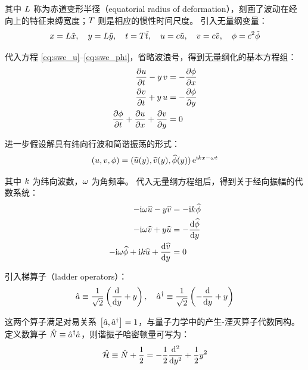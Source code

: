 其中 $L$ 称为赤道变形半径（equatorial radius of deformation），刻画了波动在经向上的特征束缚宽度；$T$ 则是相应的惯性时间尺度。
引入无量纲变量：
\begin{equation}
    x = L\tilde{x}, \quad y = L\tilde{y}, \quad t = T\tilde{t}, \quad u = c\tilde{u}, \quad v = c\tilde{v}, \quad \phi = c^2\tilde{\phi}
\end{equation}

代入方程 \eqref{eq:swe_u}--\eqref{eq:swe_phi}，省略波浪号，得到无量纲化的基本方程组：
\begin{align}
    \pde{u}{\timevar} - y\, v &= -\pde{\gravpotential}{x} \label{eq:nondim_u}\\
    \pde{v}{\timevar} + y\, u &= -\pde{\gravpotential}{y} \label{eq:nondim_v}\\
    \pde{\gravpotential}{\timevar} + \pde{u}{x} + \pde{v}{y} &= 0 \label{eq:nondim_phi}
\end{align}

进一步假设解具有纬向行波和简谐振荡的形式：
\begin{equation}
    (u, v, \phi) = (\widehat{u}(y), \widehat{v}(y), \widehat{\phi}(y))\, \mathrm{e}^{\mathrm{i} k x - \omega t}
    \label{eq:wave_ansatz}
\end{equation}

其中 $k$ 为纬向波数，$\omega$ 为角频率。
代入无量纲方程组后，得到关于经向振幅的代数系统：
\begin{align}
    -\ii\frequency\complexamp{u} - y\complexamp{v} &= -\ii\wavenum\complexamp{\gravpotential} \label{eq:spectral_u}\\
    -\ii\frequency\complexamp{v} + y\complexamp{u} &= -\ode{\complexamp{\gravpotential}}{y} \label{eq:spectral_v}\\
    -\ii\frequency\complexamp{\gravpotential} + \ii\wavenum\complexamp{u} + \ode{\complexamp{v}}{y} &= 0 \label{eq:spectral_phi}
\end{align}

引入梯算子（ladder operators）：
\begin{equation}
    \aop \equiv \frac{1}{\sqrt{2}}\left(\ode{}{y} + y\right), \quad \adop \equiv \frac{1}{\sqrt{2}}\left(-\ode{}{y} + y\right)
    \label{eq:ladder_operators}
\end{equation}

这两个算子满足对易关系 $\left[ \hat{a}, \hat{a}^{\dagger} \right] = 1$，与量子力学中的产生-湮灭算子代数同构。
定义数算子 $\hat{N} \equiv \hat{a}^{\dagger}\hat{a}$，则谐振子哈密顿量可写为：
\begin{equation}
    \Hop \equiv \Nop + \frac{1}{2} = -\frac{1}{2}\ode[2]{}{y} + \frac{1}{2}y^2
    \label{eq:hamiltonian}
\end{equation}

